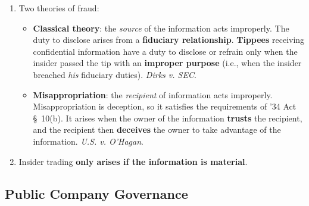 \begin{enumerate}
\begin{enumerate}
\begin{enumerate}
{            investing} in the securities concerned. Information is 
            \textbf{material} if it would have a \textbf{substantial effect on 
            the market price of the security}.\footnote{Casebook p. 471.} 
            \emph{SEC v. Texas Gulf Sulphur Co.} (the misleading press release 
            case, holding that the information was material). %
            \item Two theories of fraud:
            \begin{itemize}
                \item \textbf{Classical theory}: the \emph{source} of the 
                information acts improperly. The duty to disclose arises from 
                a \textbf{fiduciary relationship}. \textbf{Tippees} receiving 
                confidential information have a duty to disclose or refrain only when the 
                insider passed the tip with an \textbf{improper purpose} 
                (i.e., when the insider breached \emph{his} fiduciary duties).  
                \emph{Dirks v. SEC}.
                \item \textbf{Misappropriation}: the \emph{recipient} of 
                information acts improperly. Misappropriation is deception, so 
                it satisfies the requirements of '34 Act \S\ 10(b). It arises 
                when the owner of the information \textbf{trusts} the 
                recipient, and the recipient then \textbf{deceives} the owner 
                to take advantage of the information.  \emph{U.S. v. O'Hagan}. 
            \end{itemize}
            \item Insider trading \textbf{only arises if the information is 
            material}.
        \end{enumerate}
    \end{enumerate}
\end{enumerate}

\newpage

\subsection{Public Company Governance}

